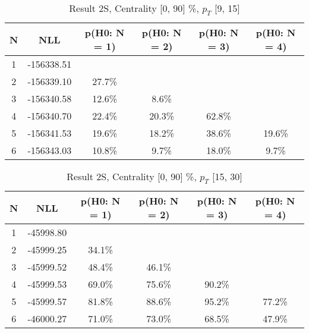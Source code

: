 \begin{table}[htb]
	\begin{center}
	\caption{Result 2S, Centrality [0, 90] \%, $p_{T}$ [9, 15] \GeV
}
{\footnotesize\renewcommand{\arraystretch}{1.4}
		\begin{tabular}{cc||>{\columncolor[gray]{0.8}}cccc}
			N & NLL & p(H0: N = 1) & p(H0: N = 2) & p(H0: N = 3) & p(H0: N = 4)\\ 
		\hline
1 & -156338.51 & & & &\\
2 & -156339.10 & 27.7\% & & &\\
3 & -156340.58 & 12.6\% & 8.6\% & &\\
4 & -156340.70 & 22.4\% & 20.3\% & 62.8\% &\\
5 & -156341.53 & 19.6\% & 18.2\% & 38.6\% & 19.6\%\\
6 & -156343.03 & 10.8\% & 9.7\% & 18.0\% & 9.7\% \\
	\end{tabular}
		\label{tab:lab}
	}
	\end{center}\end{table}

\begin{table}[htb]
	\begin{center}
	\caption{Result 2S, Centrality [0, 90] \%, $p_{T}$ [15, 30] \GeV
}
{\footnotesize\renewcommand{\arraystretch}{1.4}
		\begin{tabular}{cc||>{\columncolor[gray]{0.8}}cccc}
			N & NLL & p(H0: N = 1) & p(H0: N = 2) & p(H0: N = 3) & p(H0: N = 4)\\ 
		\hline
1 & -45998.80 & & & &\\
2 & -45999.25 & 34.1\% & & &\\
3 & -45999.52 & 48.4\% & 46.1\% & &\\
4 & -45999.53 & 69.0\% & 75.6\% & 90.2\% &\\
5 & -45999.57 & 81.8\% & 88.6\% & 95.2\% & 77.2\%\\
6 & -46000.27 & 71.0\% & 73.0\% & 68.5\% & 47.9\% \\
	\end{tabular}
		\label{tab:lab}
	}
	\end{center}\end{table}

